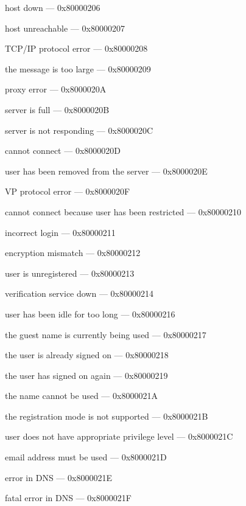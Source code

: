 \documentclass[titlepage,oneside]{book}
\begin{document}
host down                                         --- 0x80000206

host unreachable                                  --- 0x80000207

TCP/IP protocol error                             --- 0x80000208

the message is too large                          --- 0x80000209

proxy error                                       --- 0x8000020A

server is full                                    --- 0x8000020B

server is not responding                          --- 0x8000020C

cannot connect                                    --- 0x8000020D

user has been removed from the server             --- 0x8000020E

VP protocol error                                 --- 0x8000020F

cannot connect because user has been restricted   --- 0x80000210

incorrect login                                   --- 0x80000211

encryption mismatch                               --- 0x80000212

user is unregistered                              --- 0x80000213

verification service down                         --- 0x80000214

user has been idle for too long                   --- 0x80000216

the guest name is currently being used            --- 0x80000217

the user is already signed on                     --- 0x80000218

the user has signed on again                      --- 0x80000219

the name cannot be used                           --- 0x8000021A

the registration mode is not supported            --- 0x8000021B

user does not have appropriate privilege level    --- 0x8000021C

email address must be used                        --- 0x8000021D

error in DNS                                      --- 0x8000021E

fatal error in DNS                                --- 0x8000021F
\end{document}
